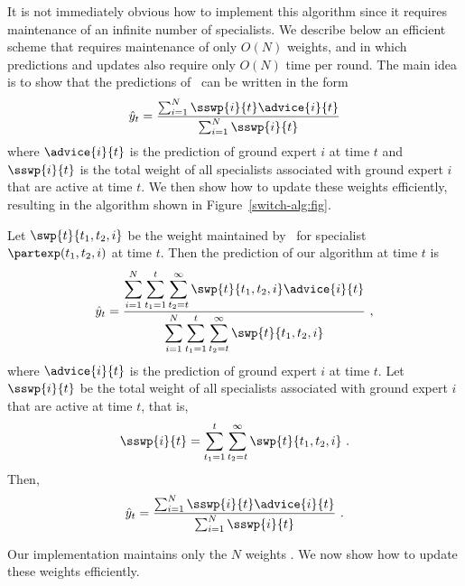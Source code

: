 It is not immediately obvious how to implement this algorithm since it
requires maintenance of an infinite number of specialists.
%
We describe below an efficient scheme that requires maintenance of only
$O(N)$ weights, and in which predictions and updates also require only
$O(N)$ time per round.
The main idea is to show that the predictions of \SBayes\ can be
written in the form
\[
  \hat{y}_t = \frac{\sum_{i=1}^N \sswp{i}{t} \advice{i}{t}}
                   {\sum_{i=1}^N \sswp{i}{t}}
\]
where $\advice{i}{t}$ is the prediction of ground expert $i$ at time
$t$ and $\sswp{i}{t}$ is the total weight of all specialists associated with
ground expert $i$ that are active at time $t$.
We then show how to update these weights efficiently, resulting in the
algorithm shown in Figure~\ref{switch-alg:fig}.

Let $\swp{t}{t_1,t_2,i}$ be the weight maintained by \SBayes\ for specialist
$\partexp(t_1,t_2,i)$ at time $t$.
Then the prediction of our algorithm at time $t$ is
\[\hat{y}_t =
\frac{\displaystyle \sum_{i=1}^N \sum_{t_1 = 1}^t
	\sum_{t_2=t}^\infty \swp{t}{t_1,t_2,i} \advice{i}{t}}
{\displaystyle \sum_{i=1}^N \sum_{t_1 = 1}^t
	\sum_{t_2=t}^\infty \swp{t}{t_1,t_2,i}} ~ ,
\]
where $\advice{i}{t}$ is the prediction of ground expert $i$ at time $t$.
Let $\sswp{i}{t}$ be the total weight of all specialists associated with
ground expert $i$ that are active at time $t$, that is,
\[
\sswp{i}{t} = \sum_{t_1 = 1}^t \sum_{t_2=t}^\infty \swp{t}{t_1,t_2,i} ~ .
\]
Then,
\[
  \hat{y}_t = \frac{\sum_{i=1}^N \sswp{i}{t} \advice{i}{t}}
                   {\sum_{i=1}^N \sswp{i}{t}} ~ .
\]

Our implementation maintains only the $N$ weights 
.
We now show how to update these weights efficiently.

